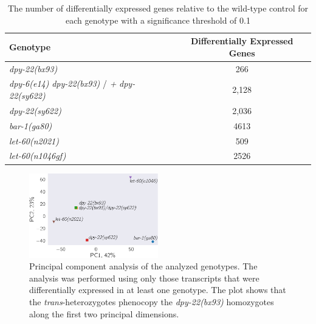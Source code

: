 \documentclass[8pt, twocolumn]{article}
\newcommand{\gene}[1]{\mbox{\emph{#1}}}
\newcommand{\dpy}[1]{\gene{dpy-22#1}}
\newcommand{\strongn}{2,036}
\newcommand{\weakn}{266}
\newcommand{\transn}{2,128}
\newcommand{\bx}{\dpy{(bx93)}}
\newcommand{\sy}{\dpy{(sy622)}}
\begin{document}
\begin{table}
 \centering
 \begin{tabular}{lc}
   \toprule
   Genotype & Differentially Expressed Genes\\
   \midrule
   \bx{} & \weakn{}\\
   \gene{dpy-6(e14)} \dpy{(bx93)} / \emph{+} \dpy{(sy622)} & \transn{}\\
   \sy{} & \strongn{}\\
   \gene{bar-1(ga80)} & 4613\\
   \gene{let-60(n2021)} & 509\\
   \gene{let-60(n1046gf)} & 2526\\
   \bottomrule
 \end{tabular}
 \caption{
          The number of differentially expressed genes relative to the wild-type
          control for each genotype with a significance threshold of 0.1
          }
\label{tab:numbers}
\end{table}


\begin{figure}
  \centering{}
  \includegraphics[width=0.5\textwidth]{../figs/pca.pdf}
  \caption{
           Principal component analysis of the analyzed genotypes. The
           analysis was performed using only those transcripts that were
           differentially expressed in at least one genotype. The plot shows
           that the \emph{trans}-heterozygotes phenocopy the \bx{} homozygotes
           along the first two principal dimensions.
           }
\label{fig:pca}
\end{figure}
\end{document}
